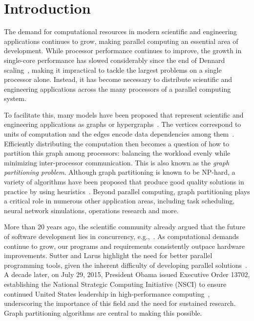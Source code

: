 \chapter{Introduction} \label{chap:introduction}
The demand for computational resources in modern scientific and engineering applications continues to grow, making parallel computing an essential area of development. While processor performance continues to improve, the growth in single-core performance has slowed considerably since the end of Dennard scaling~\cite{hennessy_new_2019}, making it impractical to tackle the largest problems on a single processor alone. Instead, it has become necessary to distribute scientific and engineering applications across the many processors of a parallel computing system.

To facilitate this, many models have been proposed that represent scientific and engineering applications as graphs or hypergraphs~\cite{umpa_2013, CatalyurekU.V.1999Hdfp, two_dimensional_part2010, hendrickson_graph_2000, WalshawC.1997PDGP}. The vertices correspond to units of computation and the edges encode data dependencies among them~\cite{hendrickson_graph_2000}. Efficiently distributing the computation then becomes a question of how to partition this graph among processors: balancing the workload evenly while minimizing inter-processor communication. This is also known as the \emph{graph partitioning problem}. Although graph partitioning is known to be NP-hard, a variety of algorithms have been proposed that produce good quality solutions in practice by using heuristics~\cite{karypis_analysis_1995, karypis_multilevelk-way_1998, karypis_parallel_1999, hendrickson_multilevel_1995}. Beyond parallel computing, graph partitioning plays a critical role in numerous other application areas, including task scheduling, neural network simulations, operations research and more.

More than 20 years ago, the scientific community already argued that the future of software development lies in concurrency, e.g.,~\cite{SutterHerb2005Satc}. As computational demands continue to grow, our programs and requirements consistently outpace hardware improvements. Sutter and Larus highlight the need for better parallel programming tools, given the inherent difficulty of developing parallel solutions~\cite{SutterHerb2005Satc}. A decade later, on July 29, 2015, President Obama issued Executive Order 13702, establishing the National Strategic Computing Initiative (NSCI) to ensure continued United States leadership in high-performance computing~\cite{obama_nsci_2015}, underscoring the importance of this field and the need for sustained research. Graph partitioning algorithms are central to making this possible.

